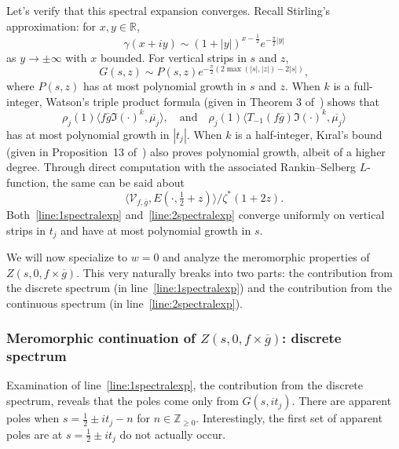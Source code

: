 \begin{remark}\label{rem:extraremark}
Let's verify that this spectral expansion converges.
Recall Stirling's approximation: for $x,y \in \mathbb{R}$,
\begin{equation}
  \gamma(x+iy) \sim (1+|y|)^{x-\frac{1}{2}}e^{-\frac{\pi}{2}|y|}
\end{equation}
as $y \to \pm\infty$ with $x$ bounded.
For vertical strips in $s$ and $z$,
\begin{equation}
  G(s,z) \sim P(s,z) e^{-\frac{\pi}{2}(2\max(|s|,|z|)-2|s|)},
\end{equation}
where $P(s,z)$ has at most polynomial growth in $s$ and $z$.
When $k$ is a full-integer, Watson's triple product formula (given in Theorem 3
of~\cite{watson2008rankin}) shows that
\begin{equation}
  \rho_j(1)\langle f\overline{g} \Im(\cdot)^k,\overline{\mu_j}\rangle, \quad \text{and}
  \quad  \rho_j(1)\langle T_{-1}(f\overline{g}) \Im(\cdot)^k,\overline{\mu_j}\rangle
\end{equation}
has at most polynomial growth in $|t_j|$.
When $k$ is a half-integer, K\i{}ral's bound (given in Proposition~13
of~\cite{mehmet2015}) also proves polynomial growth, albeit of a higher degree.
Through direct computation with the associated Rankin--Selberg $L$-function, %
the same can be said about
\begin{equation}
  \langle \mathcal{V}_{f,\overline{g} }, E(\cdot,\tfrac{1}{2}+z)\rangle / \zeta^*(1+2z).
\end{equation}
Both~\eqref{line:1spectralexp} and~\eqref{line:2spectralexp} converge uniformly on
vertical strips in $t_j$ and have at most polynomial growth in $s$.
\end{remark}


We will now specialize to $w = 0$ and analyze the meromorphic properties of $Z(s, 0,
f\times \overline{g})$.
This very naturally breaks into two parts: the contribution from the discrete spectrum (in
line~\eqref{line:1spectralexp}) and the contribution from the continuous spectrum (in
line~\eqref{line:2spectralexp}).


\subsubsection{Meromorphic continuation of $Z(s, 0, f\times \overline{g})$: discrete spectrum}


Examination of line~\eqref{line:1spectralexp}, the contribution from the discrete
spectrum, reveals that the poles come only from $G(s, it_j)$.
There are apparent poles when $s = \tfrac{1}{2} \pm it_j - n$ for $n \in \mathbb{Z}_{\geq
0}$.
Interestingly, the first set of apparent poles are at $s = \frac{1}{2} \pm it_j$ do not
actually occur.


